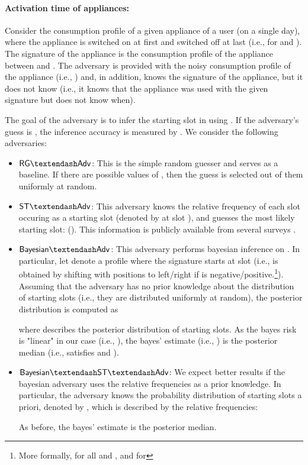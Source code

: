 \documentclass[11pt,a4paper]{article}
\theoremstyle{plain}
\theoremstyle{plain}
\theoremstyle{plain}
\theoremstyle{plain}
\theoremstyle{nonumberplain} \theoremseparator{}
\newcommand{\rndadv}{\ensuremath{\mathsf{RG\textendash Adv}}\xspace}
\newcommand{\statadv}{\ensuremath{\mathsf{ST\textendash Adv}}\xspace}
\newcommand{\bstatadv}{\ensuremath{\mathsf{Bayesian\textendash ST\textendash Adv}}\xspace}
\newcommand{\badv}{\ensuremath{\mathsf{Bayesian\textendash Adv}}\xspace}
\begin{document}
\paragraph{Activation time of appliances:}
Consider the consumption profile  of a given appliance of a user (on a single day), where the appliance is switched on at  first and switched off at  last (i.e.,  for  and ).
The signature of the appliance  is the consumption profile of the appliance between  and .
The adversary is provided with the noisy consumption profile of the appliance (i.e., ) and, in addition, knows the signature of the appliance, but it does not know 	
(i.e., it knows that the appliance was used with the given signature but does not know when).

The goal of the adversary is to infer the starting slot  in  using .
If the adversary's guess is , the inference accuracy is measured by .
We consider the following adversaries:
\begin{itemize}
\item \rndadv: This is the simple random guesser and serves as a baseline. If there are  possible values of , then the guess  is selected out of them uniformly at random.
\item \statadv: This adversary knows the relative frequency of each slot occuring as a starting slot (denoted by  at slot ), and guesses the most likely starting slot:  (). This information is publicly available from several surveys \cite{richardson10}.  
\item \badv: This adversary performs bayesian inference on . 
In particular, let  denote a profile where the signature starts at slot  (i.e.,  is obtained by shifting  with  positions to left/right if  is negative/positive.\footnote{More formally,  for all  and , and  for }). Assuming that 
the adversary has no prior knowledge about the distribution of starting slots (i.e., they are distributed uniformly at random), the posterior distribution is
computed as 

where  describes the posterior distribution of starting slots.
As the bayes risk is "linear" in our case (i.e., ), the bayes' estimate (i.e., ) is the
posterior median (i.e.,  satisfies  and ).

\item \bstatadv: We expect better results if the bayesian adversary uses the relative frequencies as a prior
knowledge. In particular, the adversary knows the probability distribution of starting slots a priori, denoted by , which is described by the relative frequencies:

As before, the bayes' estimate is the posterior median.
\end{itemize}
\end{document}
